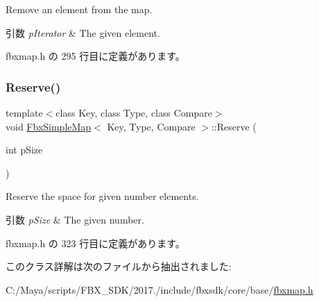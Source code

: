 Remove an element from the map. 
\begin{DoxyParams}{引数}
{\em p\+Iterator} & The given element. \\
\hline
\end{DoxyParams}


 fbxmap.\+h の 295 行目に定義があります。

\mbox{\label{class_fbx_simple_map_a73177350fd95bfea14e39e78d077921f}} 
\subsubsection{\texorpdfstring{Reserve()}{Reserve()}}
{\footnotesize\ttfamily template$<$class Key, class Type, class Compare$>$ \\
void \hyperlink{class_fbx_simple_map}{Fbx\+Simple\+Map}$<$ Key, Type, Compare $>$\+::Reserve (\begin{DoxyParamCaption}\item[{int}]{p\+Size }\end{DoxyParamCaption})\hspace{0.3cm}{\ttfamily [inline]}}

Reserve the space for given number elements. 
\begin{DoxyParams}{引数}
{\em p\+Size} & The given number. \\
\hline
\end{DoxyParams}


 fbxmap.\+h の 323 行目に定義があります。



このクラス詳解は次のファイルから抽出されました\+:\begin{DoxyCompactItemize}
\item 
C\+:/\+Maya/scripts/\+F\+B\+X\+\_\+\+S\+D\+K/2017./include/fbxsdk/core/base/\hyperlink{fbxmap_8h}{fbxmap.\+h}\end{DoxyCompactItemize}
